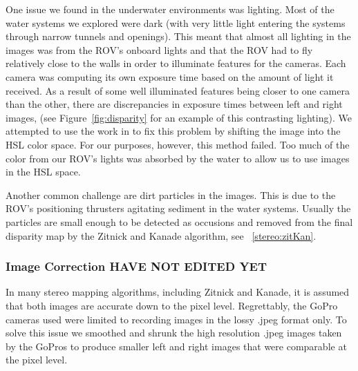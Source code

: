 \documentclass[twocolumn]{article}
\begin{document}
One issue we found in the underwater environments was lighting.  Most of the water systems we explored were dark (with very little light entering the systems through narrow tunnels and openings).  This meant that almost all lighting in the images was from the ROV's onboard lights and that the ROV had to fly relatively close to the walls in order to illuminate features for the cameras.
Each camera was computing its own exposure time based on the amount of light it received.  
As a result of some well illuminated features being closer to one camera than the other, there are discrepancies in exposure times between left and right images, (see Figure~\ref{fig:disparity} for an example of this contrasting lighting).
We attempted to use the work in \cite{stereo:nalGast} to fix this problem by shifting the image into the HSL color space.  For our purposes, however, this method failed.  Too much of the color from our ROV's lights was absorbed by the water to allow us to use images in the HSL space.

Another common challenge are dirt particles in the images.
This is due to the ROV's positioning thrusters agitating sediment in the water systems.
Usually the particles are small enough to be detected as occusions and removed from the final disparity map by the Zitnick and Kanade algorithm, see ~\ref{stereo:zitKan}.

\subsubsection{Image Correction HAVE NOT EDITED YET}
\label{subsec:image_correction}

In many stereo mapping algorithms, including Zitnick and Kanade, it is assumed that both images are accurate down to the pixel level.
Regrettably, the GoPro cameras used were limited to recording images in the lossy .jpeg format only.
To solve this issue we smoothed and shrunk the high resolution .jpeg images taken by the GoPros to produce smaller left and right images that were comparable at the pixel level.
\end{document}
